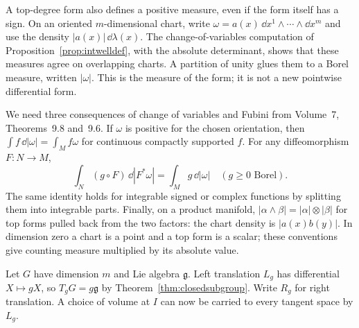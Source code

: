 A top-degree form also defines a positive measure, even if the form itself
has a sign. On an oriented $m$-dimensional chart, write
$\omega=a(x)\,\dd x^1\wedge\cdots\wedge\dd x^m$ and use the density
$|a(x)|\,\dd\lambda(x)$. The change-of-variables computation of
Proposition~\ref{prop:intwelldef}, with the absolute determinant, shows
that these measures agree on overlapping charts. A partition of unity
glues them to a Borel measure, written $|\omega|$.
This is the measure of the form; it is not a new pointwise differential form.

We need three consequences of change of variables and Fubini from
Volume~7, Theorems~9.8 and~9.6. If $\omega$ is positive for the chosen
orientation, then $\int f\,\dd|\omega|=\int_Mf\omega$ for continuous
compactly supported $f$. For any diffeomorphism $F:N\to M$,
\[
 \int_N(g\circ F)\,\dd|F^*\omega|=\int_Mg\,\dd|\omega|
 \quad(g\ge0\text{ Borel}).
\]
The same identity holds for integrable signed or complex functions by
splitting them into integrable parts. Finally, on a product manifold,
$|\alpha\wedge\beta|=|\alpha|\otimes|\beta|$ for top forms pulled
back from the two factors: the chart density is $|a(x)b(y)|$.
In dimension zero a chart is a point and a top form is a scalar;
these conventions give counting measure multiplied by its absolute value.

Let $G$ have dimension $m$ and Lie algebra $\mathfrak g$.
Left translation $L_g$ has differential $X\mapsto gX$, so
$T_gG=g\mathfrak g$ by Theorem~\ref{thm:closedsubgroup}.
Write $R_g$ for right translation. A choice of volume at $I$ can now
be carried to every tangent space by $L_g$.

